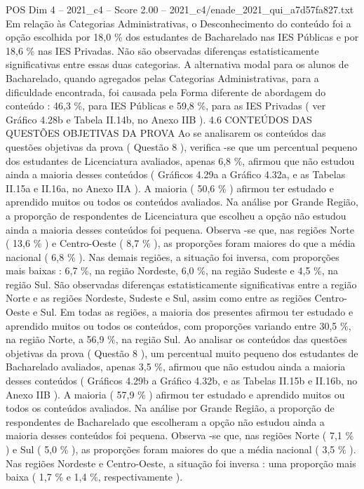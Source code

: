 \begin{textsample}{POS Dim 4 – 2021\_c4 – Score 2.00 – 2021\_c4/enade\_2021\_qui\_a7d57fa827.txt}
Em relação às Categorias Administrativas, o Desconhecimento do conteúdo foi a opção escolhida por 18,0 \% dos estudantes de Bacharelado nas IES Públicas e por 18,6 \% nas IES Privadas.
Não são observadas diferenças estatisticamente significativas entre essas duas categorias.
A alternativa modal para os alunos de Bacharelado, quando agregados pelas Categorias Administrativas, para a dificuldade encontrada, foi causada pela Forma diferente de abordagem do conteúdo : 46,3 \%, para IES Públicas e 59,8 \%, para as IES Privadas ( ver Gráfico 4.28b e Tabela II.14b, no Anexo IIB ). 4.6 CONTEÚDOS DAS QUESTÕES OBJETIVAS DA PROVA Ao se analisarem os conteúdos das questões objetivas da prova ( Questão 8 ), verifica -se que um percentual pequeno dos estudantes de Licenciatura avaliados, apenas 6,8 \%, afirmou que não estudou ainda a maioria desses conteúdos ( Gráficos 4.29a a Gráfico 4.32a, e as Tabelas II.15a e II.16a, no Anexo IIA ).
A maioria ( 50,6 \% ) afirmou ter estudado e aprendido muitos ou todos os conteúdos avaliados.
Na análise por Grande Região, a proporção de respondentes de Licenciatura que escolheu a opção não estudou ainda a maioria desses conteúdos foi pequena.
Observa -se que, nas regiões Norte ( 13,6 \% ) e Centro-Oeste ( 8,7 \% ), as proporções foram maiores do que a média nacional ( 6,8 \% ).
Nas demais regiões, a situação foi inversa, com proporções mais baixas : 6,7 \%, na região Nordeste, 6,0 \%, na região Sudeste e 4,5 \%, na região Sul.
São observadas diferenças estatisticamente significativas entre a região Norte e as regiões Nordeste, Sudeste e Sul, assim como entre as regiões Centro-Oeste e Sul.
Em todas as regiões, a maioria dos presentes afirmou ter estudado e aprendido muitos ou todos os conteúdos, com proporções variando entre 30,5 \%, na região Norte, a 56,9 \%, na região Sul.
Ao analisar os conteúdos das questões objetivas da prova ( Questão 8 ), um percentual muito pequeno dos estudantes de Bacharelado avaliados, apenas 3,5 \%, afirmou que não estudou ainda a maioria desses conteúdos ( Gráficos 4.29b a Gráfico 4.32b, e as Tabelas II.15b e II.16b, no Anexo IIB ).
A maioria ( 57,9 \% ) afirmou ter estudado e aprendido muitos ou todos os conteúdos avaliados.
Na análise por Grande Região, a proporção de respondentes de Bacharelado que escolheram a opção não estudou ainda a maioria desses conteúdos foi pequena.
Observa -se que, nas regiões Norte ( 7,1 \% ) e Sul ( 5,0 \% ), as proporções foram maiores do que a média nacional ( 3,5 \% ).
Nas regiões Nordeste e Centro-Oeste, a situação foi inversa : uma proporção mais baixa ( 1,7 \% e 1,4 \%, respectivamente ).

\end{textsample}
